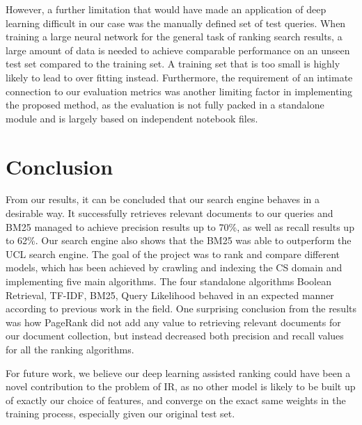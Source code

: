 However, a further limitation that would have made an application of deep learning difficult in our case was the manually defined set of test queries. When training a large neural network for the general task of ranking search results, a large amount of data is needed to achieve comparable performance on an unseen test set compared to the training set. A training set that is too small is highly likely to lead to over fitting instead. Furthermore, the requirement of an intimate connection to our evaluation metrics was another limiting factor in implementing the proposed method, as the evaluation is not fully packed in a standalone module and is largely based on independent notebook files.



\section{Conclusion} %
\label{sec:conclusion}

From our results, it can be concluded that our search engine behaves in a desirable way. It successfully retrieves relevant documents to our queries and BM25 managed to achieve precision results up to 70\%, as well as recall results up to 62\%. Our search engine also shows that the BM25 was able to outperform the UCL search engine. The goal of the project was to rank and compare different models, which has been achieved by crawling and indexing the CS domain and implementing five main algorithms. The four standalone algorithms Boolean Retrieval, TF-IDF, BM25, Query Likelihood behaved in an expected manner according to previous work in the field. One surprising conclusion from the results was how PageRank did not add any value to retrieving relevant documents for our document collection, but instead decreased both precision and recall values for all the ranking algorithms. 

For future work, we believe our deep learning assisted ranking could have been a novel contribution to the problem of IR, as no other model is likely to be built up of exactly our choice of features, and converge on the exact same weights in the training process, especially given our original test set.


